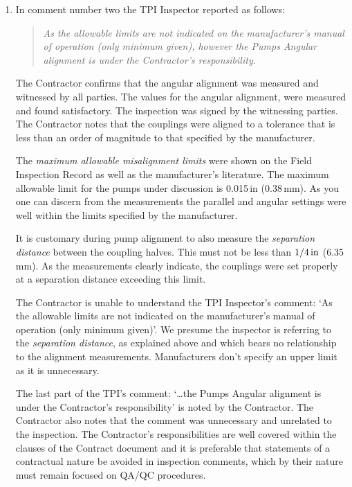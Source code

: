 \documentclass[a4paper,11pt,oneside]{article}
\begin{document}
\begin{enumerate}

\item In comment number two the TPI Inspector reported as follows:

\begin{quote}\sffamily\itshape
As the allowable limits are not indicated on the manufacturer's manual of operation (only minimum given), however the Pumps Angular alignment is under the Contractor's responsibility.
\end{quote}

The Contractor confirms that the angular alignment was measured and witnessed by all parties. The values for the angular alignment, were measured and found satisfactory. The inspection was signed by the witnessing parties. The Contractor notes that the couplings were aligned to a tolerance that is less than an order of magnitude to that specified by the manufacturer. 

The \textit{maximum allowable misalignment limits} were shown on the Field Inspection Record as well as the manufacturer's literature. The maximum allowable limit for the pumps under discussion is 0.015\,in (0.38\,mm). As you one can discern from the measurements the parallel and angular settings were well within the limits specified by the manufacturer.

It is customary during pump alignment to also measure the \textit{separation distance} between  the coupling halves. This must not be less than $1/4\,\textup{in}$ (6.35\,mm). As the measurements clearly indicate, the couplings were set properly at a separation distance exceeding this limit.

The Contractor is unable to understand the TPI Inspector's comment: `As the allowable limits are not indicated on the manufacturer's manual of operation (only minimum given)'. We presume the inspector is referring to the \textit{separation distance}, as explained above and which bears no relationship to the alignment measurements. Manufacturers don't specify an upper limit as it is unnecessary.

The last part of the TPI's comment: `\ldots the Pumps Angular alignment is under the Contractor's responsibility' is noted by the Contractor. The Contractor also notes that the comment was unnecessary and unrelated to the inspection. The Contractor's responsibilities are well covered within the clauses of the Contract document and it is  preferable that statements of a contractual nature be avoided in inspection comments, which by their nature must remain focused on QA/QC procedures.  



\end{enumerate}
\end{document}
